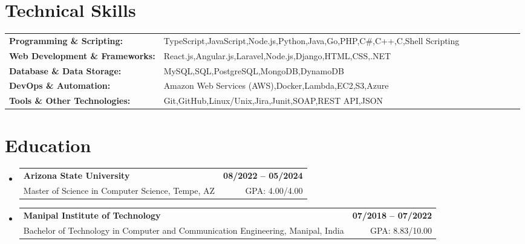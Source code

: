 \documentclass[letterpaper,11pt]{article}
\makeatletter
\newcommand{\educationSubheading}[4]{
  \vspace{-2pt}\item
    \begin{tabular*}{1.0\textwidth}[t]{l@{\extracolsep{\fill}}r}
      \textbf{\small #1} & \textbf{\small #2} \\
      {\small#3} & {\small #4} \\
    \end{tabular*}\vspace{-7pt}
}
\newcommand{\resumeSubHeadingListStart}{\begin{itemize}[leftmargin=0pt, label={}]}
\newcommand{\resumeSubHeadingListEnd}{\end{itemize}}
\makeatother
\begin{document}
\section{Technical Skills}
        \vspace{-14pt}
        \begin{table}[h]
            \footnotesize
            \begin{tabular}{p{0.3\linewidth} p{0.7\linewidth}}
                \textbf{Programming \& Scripting:} & TypeScript,JavaScript,Node.js,Python,Java,Go,PHP,C\#,C++,C,Shell Scripting \\
                \textbf{Web Development \& Frameworks:} & React.js,Angular.js,Laravel,Node.js,Django,HTML,CSS,.NET \\
                \textbf{Database \& Data Storage:} & MySQL,SQL,PostgreSQL,MongoDB,DynamoDB \\
                \textbf{DevOps \& Automation:} & Amazon Web Services (AWS),Docker,Lambda,EC2,S3,Azure \\
                \textbf{Tools \& Other Technologies:} & Git,GitHub,Linux/Unix,Jira,Junit,SOAP,REST API,JSON \\
            \end{tabular}
        \end{table}

 \vspace{-15pt}

\section{Education}
  \resumeSubHeadingListStart
    \educationSubheading
      {Arizona State University}{08/2022 -- 05/2024}
      {Master of Science in Computer Science, Tempe, AZ}{GPA: 4.00/4.00}

    \educationSubheading
      {Manipal Institute of Technology}{07/2018 -- 07/2022}
      {Bachelor of Technology in Computer and Communication Engineering, Manipal, India}{GPA: 8.83/10.00}
  \resumeSubHeadingListEnd
\end{document}
